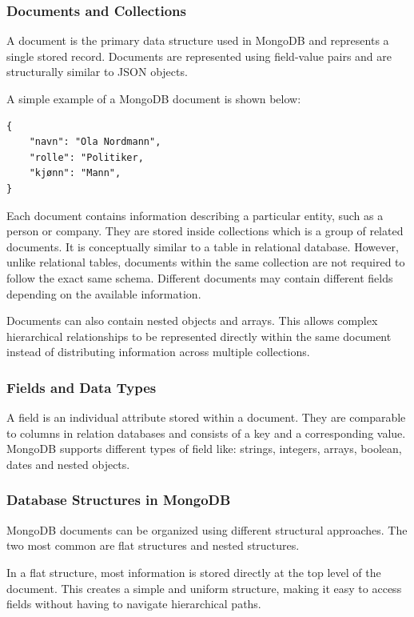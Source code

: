 \subsubsection{Documents and Collections}

A document is the primary data structure used in MongoDB and represents a single stored record. Documents are represented using field-value pairs and are structurally similar to JSON objects.

A simple example of a MongoDB document is shown below:

\begin{verbatim}
{   
    "navn": "Ola Nordmann",
    "rolle": "Politiker,
    "kjønn": "Mann",
}
\end{verbatim}

Each document contains information describing a particular entity, such as a person or company.
They are stored inside collections which is a group of related documents. It is conceptually similar to a table in relational database. However, unlike relational tables, documents within the same collection are not required to follow the exact same schema. Different documents may contain different fields depending on the available information. 

Documents can also contain nested objects and arrays. This allows complex hierarchical relationships to be represented directly within the same document instead of distributing information across multiple collections. 

\subsubsection{Fields and Data Types}

A field is an individual attribute stored within a document. They are comparable to columns in relation databases and consists of a key and a corresponding value. MongoDB supports different types of field like: strings, integers, arrays, boolean, dates and nested objects. 

\subsubsection{Database Structures in MongoDB}

MongoDB documents can be organized using different structural approaches. The two most common are flat structures and nested structures. 

In a flat structure, most information is stored directly at the top level of the document. This creates a simple and uniform structure, making it easy to access fields without having to navigate hierarchical paths. 

